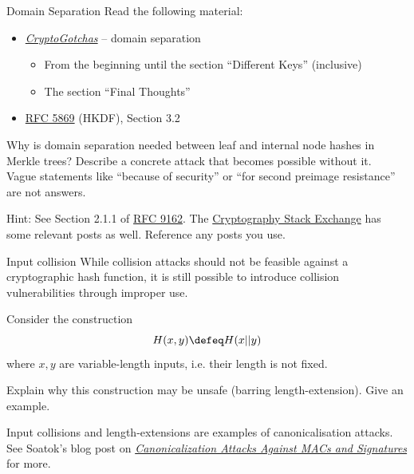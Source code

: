 \documentclass{homework}
\begin{document}
\begin{task}{Domain Separation}
  Read the following material:
  \begin{itemize}
    \item \href{https://gotchas.salusa.dev/domain_separation.html}{\textit{CryptoGotchas}} -- domain separation
    \begin{itemize}
      \item From the beginning until the section \enquote{Different Keys} (inclusive)
      \item The section \enquote{Final Thoughts}
    \end{itemize}
    \item \href{https://datatracker.ietf.org/doc/html/rfc5869#section-3.2}{RFC 5869} (HKDF), Section 3.2
  \end{itemize}

  Why is domain separation needed between leaf and internal node hashes in Merkle trees?
  Describe a concrete attack that becomes possible without it.\\
  {\scriptsize Vague statements like \enquote{because of security} or \enquote{for second preimage resistance} are not answers.}

  {\scriptsize Hint: See Section 2.1.1 of \href{https://datatracker.ietf.org/doc/html/rfc9162#section-2.1.1}{RFC 9162}.
  The \href{https://crypto.stackexchange.com}{Cryptography Stack Exchange} has some relevant posts as well.
  Reference any posts you use.}
\end{task}

\begin{task}{Input collision}
  While collision attacks should not be feasible against a cryptographic hash function, it is still possible to introduce collision vulnerabilities through improper use.

  Consider the construction
  \[
    H(x, y) \defeq H(x||y)
  \] where $x, y$ are variable-length inputs, i.e. their length is not fixed.

  Explain why this construction may be unsafe (barring length-extension).
  Give an example.

  {\scriptsize Input collisions and length-extensions are examples of canonicalisation attacks.
  See Soatok's blog post on \href{https://soatok.blog/2021/07/30/canonicalization-attacks-against-macs-and-signatures/}{\textit{Canonicalization Attacks Against MACs and Signatures}} for more.}
\end{task}

\newpage
\setcounter{task}{0}
\end{document}
